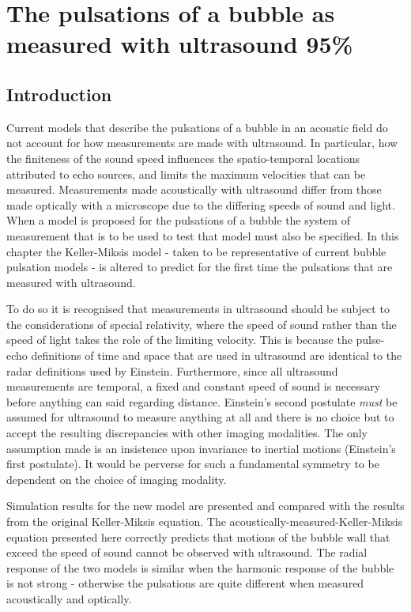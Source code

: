 
\chapter{The pulsations of a bubble as measured with  ultrasound 95\%}\label{ch:measurement}


\section{Introduction}\label{sec:introduction}

Current models that describe the pulsations of a bubble in an acoustic field do not 
account for how measurements are made with ultrasound.
In particular, how the finiteness of the sound speed influences the spatio-temporal locations attributed to echo sources,
and limits the maximum velocities that can be measured.
Measurements made acoustically with ultrasound differ from those
made optically with a microscope due to the differing speeds of sound and light.
When a model is proposed for the pulsations of a bubble
the system of measurement that is to be used to test that model must also be specified.
In this chapter the Keller-Miksis model 
- taken to be representative of current bubble pulsation models -
is altered to predict for the first time the pulsations that are  measured with ultrasound.

To do so it is recognised that measurements in ultrasound should be subject to the considerations of special relativity,
where the speed of sound rather than the speed of light takes the role of the limiting velocity.
This is because the pulse-echo definitions of time and space that are used in ultrasound are identical to the radar definitions used by Einstein.
Furthermore, since all ultrasound measurements are temporal,
a fixed and constant speed of sound is necessary before anything can said regarding distance.
Einstein's second postulate {\em must} be assumed for ultrasound to measure anything at all
and there is no choice but to accept the resulting discrepancies with other imaging modalities.
The only assumption made is an insistence upon invariance to inertial motions
(Einstein's first postulate).
It would be perverse for such a fundamental symmetry to be dependent on the choice of imaging modality.

Simulation results for the new model are presented and compared with the results from the original Keller-Miksis equation.
The acoustically-measured-Keller-Miksis equation presented here correctly predicts 
that motions of the bubble wall that exceed the speed of sound cannot be observed with ultrasound.
The radial response of the two models is similar when the harmonic response of the bubble is not strong -
otherwise the pulsations are quite different when measured acoustically and optically.


